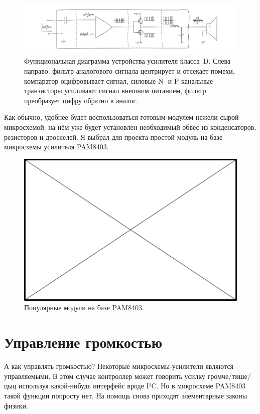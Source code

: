\begin{figure}
  \centering
  \includegraphics{sketches/sound-amp-class-d-diagram}
  \caption{Функциональная диаграмма устройства усилителя класса~D. Слева направо: фильтр аналогового сигнала центрирует и отсекает помехи, компаратор оцифровывает сигнал, силовые N- и P-канальные транзисторы усиливают сигнал внешним питанием, фильтр преобразует цифру обратно в аналог.}
  \label{fig:sound-amp-class-d-diagram}
\end{figure}

Как обычно, удобнее будет воспользоваться готовым модулем нежели сырой микросхемой: на нём уже будет установлен необходимый обвес из конденсаторов, резисторов и дросселей. Я выбрал для проекта простой модуль на базе микросхемы усилителя PAM8403.

\begin{figure}
  \centering
  \includegraphics{TODO.png}
  \caption{Популярные модули на базе PAM8403.}
  \label{fig:pam8403-modules}
\end{figure}

\section{Управление громкостью}

А как управлять громкостью? Некоторые микросхемы-усилители являются управляемыми. В этом случае контроллер может говорить усилку громче/тише/цыц используя какой-нибудь интерфейс вроде I²C. Но в микросхеме PAM8403 такой функции попросту нет. На помощь снова приходят элементарные законы физики.


